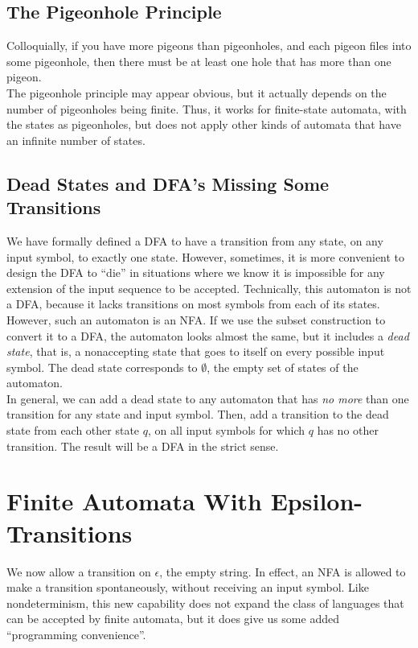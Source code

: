\documentclass[]{article}
\begin{document}
  \subsection*{The Pigeonhole Principle}
    Colloquially, if you have more pigeons than pigeonholes, and each pigeon
    files into some pigeonhole, then there must be at least one hole that has
    more than one pigeon. \\
    \indent The pigeonhole principle may appear obvious, but it actually
    depends on the number of pigeonholes being finite. Thus, it works for
    finite-state automata, with the states as pigeonholes, but does not apply
    other kinds of automata that have an infinite number of states.

  \subsection*{Dead States and DFA's Missing Some Transitions}
    We have formally defined a DFA to have a transition from any state, on any
    input symbol, to exactly one state. However, sometimes, it is more
    convenient to design the DFA to ``die'' in situations where we know it is
    impossible for any extension of the input sequence to be accepted.
    Technically, this automaton is not a DFA, because it lacks transitions on
    most symbols from each of its states. \\
    \indent However, such an automaton is an NFA. If we use the subset
    construction to convert it to a DFA, the automaton looks almost the same,
    but it includes a \emph{dead state}, that is, a nonaccepting state that
    goes to itself on every possible input symbol. The dead state corresponds
    to $\emptyset$, the empty set of states of the automaton. \\
    \indent In general, we can add a dead state to any automaton that has
    \emph{no more} than one transition for any state and input symbol. Then,
    add a transition to the dead state from each other state $q$, on all input
    symbols for which $q$ has no other transition. The result will be a DFA in
    the strict sense.

\section*{Finite Automata With Epsilon-Transitions}
  We now allow a transition on $\epsilon$, the empty string. In effect, an NFA
  is allowed to make a transition spontaneously, without receiving an input
  symbol. Like nondeterminism, this new capability does not expand the class
  of languages that can be accepted by finite automata, but it does give us
  some added ``programming convenience''.
\end{document}
